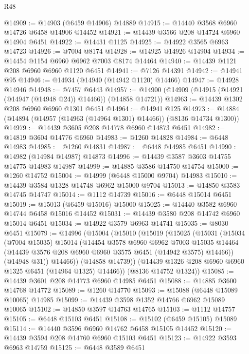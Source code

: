 \begin{lexlean}{R48}
\begin{coremodule}
@14909 := @14903 (@6459 @14906) @14889
@14915 := @14440 @3568 @6960 @14726 @6458 @14906 @14452
@14921 := @14439 @3566 @208 @14724 @6960 @14904 @6451
@14922 := @14431 @1125
@14925 := @14922 @3565 @6963 @14723
@14926 := @7004 @8174
@14928 := @14925 @14926 @14904
@14934 := @14454 @1154 @6960 @6962 @7003 @8174 @14464
@14940 := @14439 @1121 @208 @6960 @6960 @1120 @6451
@14941 := @7126 @14391
@14942 := @14941 @95
@14946 := @14934 (@14940 (@14942 @1120) @14466)
@14947 := @14928 @14946
@14948 := @7457 @6443
@14957 := @14900 (@14909 (@14915 (@14921 (@14947 (@14948 @24)) @14466)) (@14858 @14721))
@14963 := @14439 @1302 @208 @6960 @6960 @1301 @6451
@14964 := @14941 @125
@14973 := @14884 (@14894 (@14957 (@14963 (@14964 @1301) @14466)) (@8136 @14734 @1300))
@14979 := @14439 @3605 @208 @14778 @6960 @14873 @6451
@14982 := @14819 @3604 @14776 @6960
@14983 := @1260 @14828
@14984 := @6448 @14983
@14985 := @1260 @14831
@14987 := @6448 @14985 @6451
@14990 := @14982 (@14984 @14987) @14873
@14996 := @14439 @3587 @3603 @14755 @14775 @14983 @14987
@14999 := @14885 @3586 @14750 @14754
@15000 := @1260 @14752
@15004 := @14999 (@6448 @15000 @9704) @14983
@15010 := @14439 @3584 @1328 @14748 @6962 @15000 @9704
@15013 := @14850 @3583 @14745 @14747
@15014 := @1112 @14739
@15016 := @6448 @15014 @6451
@15019 := @15013 (@6459 @15016) @15000
@15025 := @14440 @3582 @6960 @14744 @6458 @15016 @14452
@15031 := @14439 @3580 @208 @14742 @6960 @15014 @6451
@15034 := @14922 @3579 @6963 @14741
@15035 := @8030 @6451
@15079 := @14996
    (@15004
      (@15010
        (@15019
          (@15025
            (@15031
              (@15034
                (@7004 @15035)
                @15014
                (@14454
                  @3578
                  @6960
                  @6962
                  @7003
                  @15035
                  @14464
                  (@14439 @3576 @208 @6960 @6960 @3575 @6451 (@14942 @3575) @14466))
                (@14948 @31))
              @14466))
          (@14858 @14739))
        (@14439 @1326 @208 @6960 @6960 @1325 @6451 (@14964 @1325) @14466))
      (@8136 @14752 @1324))
@15085 := @14439 @3601 @208 @14773 @6960 @14985 @6451
@15088 := @14885 @3600 @14768 @14772
@15089 := @1260 @14770
@15093 := @15088 (@6448 @15089 @10065) @14985
@15099 := @14439 @3598 @1352 @14766 @6962 @15089 @10065
@15102 := @14850 @3597 @14763 @14765
@15103 := @1112 @14757
@15105 := @6448 @15103 @6451
@15108 := @15102 (@6459 @15105) @15089
@15114 := @14440 @3596 @6960 @14762 @6458 @15105 @14452
@15120 := @14439 @3594 @208 @14760 @6960 @15103 @6451
@15123 := @14922 @3593 @6963 @14759
@15125 := @6448 @3589 @6451

\end{coremodule}
\end{lexlean}
